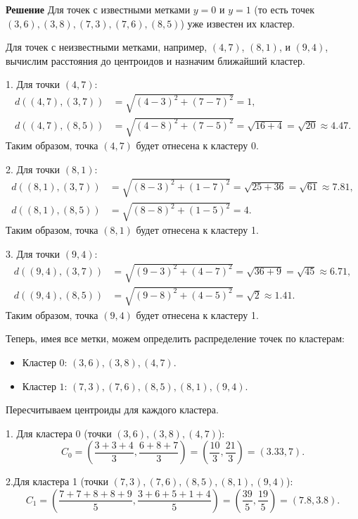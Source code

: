 \textbf{Решение}
Для точек с известными метками \(y = 0\) и \(y = 1\) (то есть точек \((3, 6), (3, 8), (7, 3), (7, 6), (8, 5)\)) уже известен их кластер.

Для точек с неизвестными метками, например, \((4, 7)\), \((8, 1)\), и \((9, 4)\), вычислим расстояния до центроидов и назначим ближайший кластер.

1. Для точки \((4, 7)\):
\[
    \begin{aligned}
        d((4, 7), (3, 7)) & = \sqrt{(4-3)^2 + (7-7)^2} = 1, \\ d((4, 7), (8, 5)) &= \sqrt{(4-8)^2 + (7-5)^2} = \sqrt{16 + 4} = \sqrt{20} \approx 4.47.
    \end{aligned}
\]
Таким образом, точка \((4, 7)\) будет отнесена к кластеру 0.

2. Для точки \((8, 1)\):
\[
    \begin{aligned}
        d((8, 1), (3, 7)) & = \sqrt{(8-3)^2 + (1-7)^2} = \sqrt{25 + 36} = \sqrt{61} \approx 7.81, \\
        d((8, 1), (8, 5)) & = \sqrt{(8-8)^2 + (1-5)^2} = 4.
    \end{aligned}
\]
Таким образом, точка \((8, 1)\) будет отнесена к кластеру 1.

3. Для точки \((9, 4)\):
\[
    \begin{aligned}
        d((9, 4), (3, 7)) & = \sqrt{(9-3)^2 + (4-7)^2} = \sqrt{36 + 9} = \sqrt{45} \approx 6.71, \\
        d((9, 4), (8, 5)) & = \sqrt{(9-8)^2 + (4-5)^2} = \sqrt{2} \approx 1.41.
    \end{aligned}
\]
Таким образом, точка \((9, 4)\) будет отнесена к кластеру 1.

Теперь, имея все метки, можем определить распределение точек по кластерам:
\begin{itemize}
    \item Кластер \(0\): \((3, 6), (3, 8), (4, 7)\).
    \item Кластер \(1\): \((7, 3), (7, 6), (8, 5), (8, 1), (9, 4)\).
\end{itemize}
Пересчитываем центроиды для каждого кластера.

1. Для кластера 0 (точки \((3, 6), (3, 8), (4, 7)\)):
\[
    C_0 = \left( \frac{3+3+4}{3}, \frac{6+8+7}{3} \right) = \left( \frac{10}{3}, \frac{21}{3} \right) = (3.33, 7).
\]

2.Для кластера 1 (точки \((7, 3), (7, 6), (8, 5), (8, 1), (9, 4)\)):
\[
    C_1 = \left( \frac{7+7+8+8+9}{5}, \frac{3+6+5+1+4}{5} \right) = \left( \frac{39}{5}, \frac{19}{5} \right) = (7.8, 3.8).
\]


